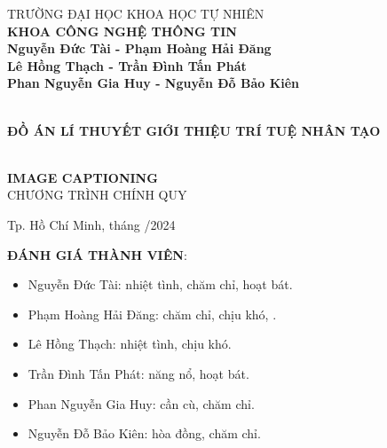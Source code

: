\documentclass{article}
\begin{document}
\begin{titlepage}

\begin{center}

TRƯỜNG ĐẠI HỌC KHOA HỌC TỰ NHIÊN\\
\textbf{KHOA CÔNG NGHỆ THÔNG TIN}\\[2cm]

{ \large \bfseries Nguyễn Đức Tài - Phạm Hoàng Hải Đăng\\ Lê Hồng Thạch - Trần Đình Tấn Phát\\ Phan Nguyễn Gia Huy - Nguyễn Đỗ Bảo Kiên\\[2cm] } 


{ \large \bfseries \textbf{ĐỒ ÁN LÍ THUYẾT GIỚI THIỆU TRÍ TUỆ NHÂN TẠO} \\[3cm]} 


\large \textbf{ IMAGE CAPTIONING }\\

\large CHƯƠNG TRÌNH CHÍNH QUY\\


\vfill
Tp. Hồ Chí Minh, tháng /2024

\end{center}

\pagebreak
\end{titlepage}
\maketitle

\tableofcontents

\textbf{ĐÁNH GIÁ THÀNH VIÊN}:
\begin{itemize}
    \item Nguyễn Đức Tài: nhiệt tình, chăm chỉ, hoạt bát. 
    \item Phạm Hoàng Hải Đăng: chăm chỉ, chịu khó,  .
    \item Lê Hồng Thạch: nhiệt tình, chịu khó.
    \item Trần Đình Tấn Phát: năng nổ, hoạt bát.
    \item Phan Nguyễn Gia Huy: cần cù, chăm chỉ.
    \item Nguyễn Đỗ Bảo Kiên: hòa đồng, chăm chỉ.
\end{itemize}
\end{document}
